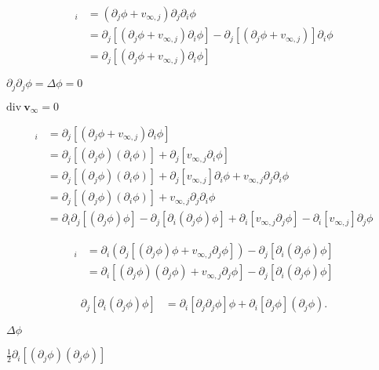 \documentclass{article}
\begin{document}
\begin{align*} [\mathbf{v}\cdot\nabla\mathbf{v}]_i &= (\partial_j\phi+v_{\infty,j}) \partial_j \partial_i\phi \\ &= \partial_j [(\partial_j\phi+v_{\infty,j}) \partial_i\phi] - \partial_j [(\partial_j\phi+v_{\infty,j})] \partial_i\phi \\ &= \partial_j [(\partial_j\phi+v_{\infty,j}) \partial_i\phi] \end{align*}
\pagebreak

$\partial_j \partial_j\phi = \Delta \phi = 0$
\pagebreak

$\textrm{div} \ \mathbf{v}_\infty=0$
\pagebreak

\begin{align*} [\mathbf{v}\cdot\nabla\mathbf{v}]_i &= \partial_j [(\partial_j\phi+v_{\infty,j}) \partial_i\phi] \\ &= \partial_j [(\partial_j\phi) (\partial_i\phi)] + \partial_j [v_{\infty,j} \partial_i\phi] \\ &= \partial_j [(\partial_j\phi) (\partial_i\phi)] + \partial_j [v_{\infty,j}] \partial_i\phi + v_{\infty,j} \partial_j \partial_i\phi \\ &= \partial_j [(\partial_j\phi) (\partial_i\phi)] + v_{\infty,j} \partial_j \partial_i\phi \\ &= \partial_i \partial_j [(\partial_j\phi) \phi] - \partial_j [\partial_i (\partial_j\phi) \phi] + \partial_i [v_{\infty,j} \partial_j \phi] - \partial_i [v_{\infty,j}] \partial_j \phi \end{align*}
\pagebreak

\begin{align*} [\mathbf{v}\cdot\nabla\mathbf{v}]_i &= \partial_i (\partial_j [(\partial_j\phi) \phi + v_{\infty,j} \partial_j \phi]) - \partial_j [\partial_i (\partial_j\phi) \phi] \\ &= \partial_i [(\partial_j\phi)(\partial_j \phi) + v_{\infty,j} \partial_j \phi] - \partial_j [\partial_i (\partial_j\phi) \phi] \end{align*}
\pagebreak

\begin{align*} \partial_j [\partial_i (\partial_j\phi) \phi] &= \partial_i [\partial_j \partial_j\phi] \phi + \partial_i [\partial_j \phi] (\partial_j \phi). \end{align*}
\pagebreak

$\Delta\phi$
\pagebreak

$\frac 12 \partial_i [(\partial_j\phi)(\partial_j\phi)]$
\pagebreak
\end{document}
